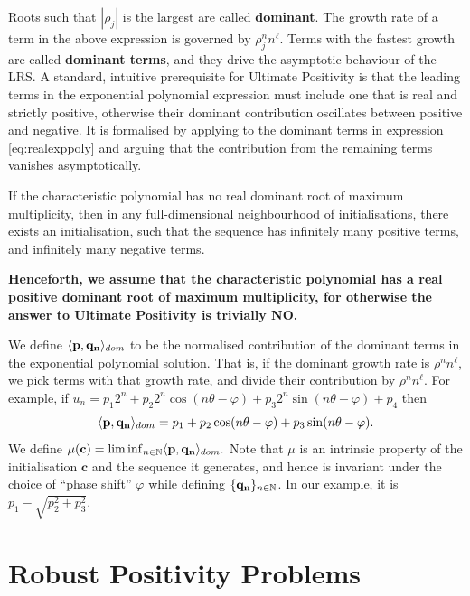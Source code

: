 Roots such that $|\rho_j|$ is the largest are called \textbf{dominant}. The growth rate of a term in the above expression is governed by $\rho_j^n n^\ell$. Terms with the fastest growth are called \textbf{dominant terms}, and they drive the asymptotic behaviour of the LRS. A standard, intuitive prerequisite for Ultimate Positivity is that the leading terms in the exponential polynomial expression must include one that is real and strictly positive, otherwise their dominant contribution oscillates between positive and negative. It is formalised by applying \cite[Lemma 4]{Braverman06} to the dominant terms in expression \ref{eq:realexppoly} and arguing that the contribution from the remaining terms vanishes asymptotically. 
\begin{proposition}
\label{prop:folklore}
If the characteristic polynomial has no real dominant root of maximum multiplicity, then in any full-dimensional neighbourhood of initialisations, there exists an initialisation, such that the sequence has infinitely many positive terms, and infinitely many negative terms.
\end{proposition}

\textbf{Henceforth, we assume that the characteristic polynomial has a real positive dominant root of maximum multiplicity, for otherwise the answer to Ultimate Positivity is trivially NO.} 

We define $\langle\mathbf{p}, \mathbf{q_n}\rangle_{dom}$ to be the normalised contribution of the dominant terms in the exponential polynomial solution. That is, if the dominant growth rate is $\rho^n n^\ell$, we pick terms with that growth rate, and divide their contribution by $\rho^n n^\ell$. For example, if
$
u_n = p_1 2^n + p_2 2^n\cos (n\theta -\varphi) + p_3 2^n \sin (n\theta-\varphi) + p_4
$
then $$\langle\mathbf{p}, \mathbf{q_n}\rangle_{dom} = p_1  + p_2 \cos (n\theta-\varphi) + p_3 \sin (n\theta-\varphi).$$
We define
$
\mu(\mathbf{c}) = \liminf_{n \in \mathbb{N}} \langle\mathbf{p}, \mathbf{q_n}\rangle_{dom}.
$
Note that $\mu$ is an intrinsic property of the initialisation $\mathbf{c}$ and the sequence it generates, and hence is invariant under the choice of ``phase shift'' $\varphi$ while defining $\{\mathbf{q_n}\}_{n\in \mathbb{N}}$. In our example, it is $p_1 - \sqrt{p_2^2 + p_3^2}$.

\section{Robust Positivity Problems}
\label{section:problems}


